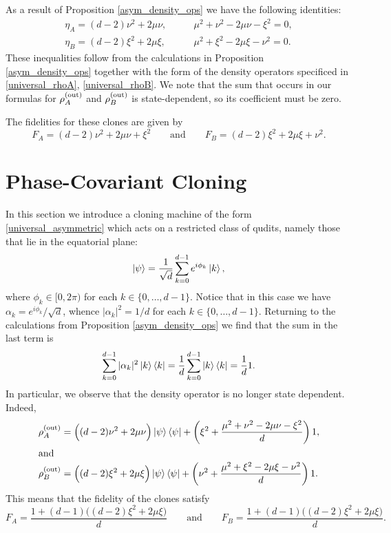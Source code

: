 \documentclass[reqno]{amsart}
\numberwithin{lemma}{section}
\numberwithin{proposition}{section}
\newcommand{\out}{\textnormal{out}}
\begin{document}
{As a result of Proposition \ref{asym_density_ops} we have the following identities:
\begin{align*}
\eta_{A} = (d-2) \nu^{2} + 2 \mu \nu, &\qquad \mu^{2} + \nu^{2} - 2\mu \nu - \xi^{2} = 0,\\
\eta_{B} = (d-2) \xi^{2} + 2 \mu \xi, &\qquad \mu^{2} + \xi^{2} - 2\mu \xi - \nu^{2} = 0.
\end{align*}
These inequalities follow from the calculations in Proposition \ref{asym_density_ops} together with the form of the density operators specificed in \eqref{universal_rhoA}, \eqref{universal_rhoB}. We note that the sum that occurs in our formulas for $\rho_{A}^{(\out)}$ and $\rho_{B}^{(\out)}$ is state-dependent, so its coefficient must be zero. 

The fidelities for these clones are given by
\begin{equation*}
F_{A} = (d-2) \nu^{2} + 2 \mu \nu + \xi^{2} \qquad \text{and} \qquad
F_{B} = (d-2) \xi^{2} + 2 \mu \xi + \nu^{2}.
\end{equation*}

\section{Phase-Covariant Cloning}

In this section we introduce a cloning machine of the form \eqref{universal_asymmetric} which acts on a restricted class of qudits, namely those that lie in the equatorial plane:
\begin{equation}
\ket{\psi} = \frac{1}{\sqrt{d}} \sum_{k=0}^{d-1} e^{i\phi_{k}} \ket{k},
\end{equation}
where $\phi_{k} \in [0, 2\pi)$ for each $k \in \{0,\ldots, d-1\}$.
Notice that in this case we have $ \alpha_{k} = e^{i\phi_{k}}/\sqrt{d}$, whence $\vert \alpha_{k} \vert^{2} = 1/d$ for each $k \in \{ 0,\ldots,d-1 \}$. Returning to the calculations from Proposition \ref{asym_density_ops} we find that the sum in the last term is
\begin{equation*}
\sum_{k=0}^{d-1} \vert \alpha_{k} \vert^{2} \ket{k} \bra{k} = \frac{1}{d} \sum_{k=0}^{d-1} \ket{k}\bra{k} = \frac{1}{d} 1.
\end{equation*}
In particular, we observe that the density operator is no longer state dependent. Indeed,
\begin{align*}
\rho_{A}^{(\out)} &= \Big ( (d-2) \nu^{2} + 2 \mu \nu \Big ) \ket{\psi}\bra{\psi} + \left ( \xi^{2} + \frac{\mu^{2} + \nu^{2} - 2\mu \nu - \xi^{2}}{d} \right )1,  \\
\intertext{and}
\rho_{B}^{(\out)} &= \Big ( (d-2) \xi^{2} + 2 \mu \xi \Big ) \ket{\psi}\bra{\psi} + \left ( \nu^{2} + \frac{\mu^{2} + \xi^{2} - 2\mu \xi - \nu^{2}}{d} \right )1.
\end{align*}
This means that the fidelity of the clones satisfy
\begin{equation*}
F_{A} = \frac{1 + (d-1)\Big ( (d-2) \xi^{2} + 2 \mu \xi \Big )}{d} \qquad \text{and} \qquad F_{B} = \frac{ 1 + (d-1)\Big ( (d-2) \xi^{2} + 2 \mu \xi \Big )}{d}.
\end{equation*}

}
\end{document}
